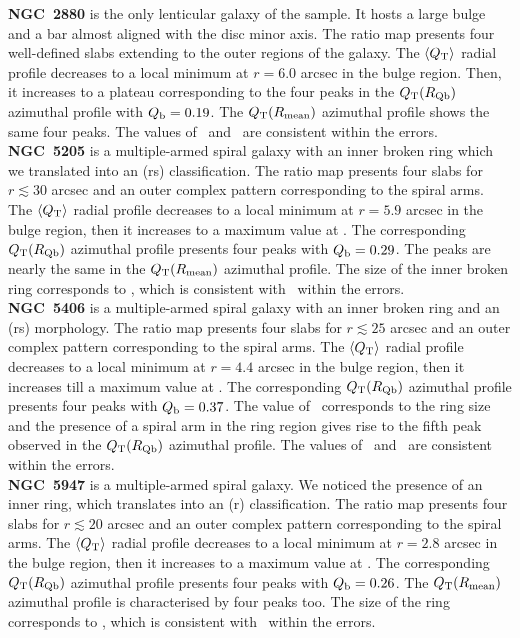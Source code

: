 \documentclass{aa}
\begin{document}
\noindent \textbf{NGC~2880} is the only lenticular galaxy of the sample. It hosts a large bulge and a bar almost aligned with the disc minor axis. The ratio map presents four well-defined slabs extending to the outer regions of the galaxy. The $\langle Q_{\rm T}\rangle$ radial profile decreases to a local minimum at $r=6.0$ arcsec in the bulge region. Then, it increases to a plateau corresponding to the four peaks in the $Q_{\rm T}(R_{\rm Qb})$ azimuthal profile with $Q_{\rm b}=0.19$. The $Q_{\rm T}(R_{\rm mean})$
azimuthal profile shows the same four peaks. The values of \rmean\ and \rqb\ are consistent within the errors.\\

\noindent \textbf{NGC~5205} is a multiple-armed spiral galaxy with an inner broken ring which we translated into an (rs) classification. The ratio map presents four slabs for $r\lesssim30$ arcsec and an outer complex pattern corresponding to the spiral arms. The $\langle Q_{\rm T}\rangle$ radial profile decreases to a local minimum at $r=5.9$ arcsec in the bulge region, then it increases to a maximum value at \rqb. The corresponding $Q_{\rm T}(R_{\rm Qb})$ azimuthal profile presents four peaks with $Q_{\rm b}=0.29$. The peaks are nearly the same in the $Q_{\rm T}(R_{\rm mean})$ azimuthal profile. The size of the inner broken ring corresponds to \rmean, which is consistent with \rqb\ within the errors.\\

\noindent \textbf{NGC~5406} is a multiple-armed spiral galaxy with an inner broken ring and an (rs) morphology. The ratio map presents four slabs for $r\lesssim25$ arcsec and an outer complex pattern corresponding to the spiral arms. The $\langle Q_{\rm T}\rangle$ radial profile decreases to a local minimum at $r=4.4$ arcsec in the bulge region, then it increases till a maximum value at \rqb. The corresponding $Q_{\rm T}(R_{\rm Qb})$ azimuthal profile presents four peaks with $Q_{\rm b}=0.37$. The value of \rmean\ corresponds to the ring size and the presence of a spiral arm in the ring region gives rise to the fifth peak observed in the $Q_{\rm T}(R_{\rm Qb})$ azimuthal profile. The values of \rmean\ and \rqb\ are consistent within the errors.\\

\noindent \textbf{NGC~5947} is a multiple-armed spiral galaxy. We noticed the presence of an inner ring, which translates into an (r) classification. The ratio map presents four slabs for $r\lesssim20$ arcsec and an outer complex pattern corresponding to the spiral arms. The $\langle Q_{\rm T}\rangle$ radial profile decreases to a local minimum at $r=2.8$ arcsec in the bulge region, then it increases to a maximum value at \rqb. The corresponding $Q_{\rm T}(R_{\rm Qb})$ azimuthal profile presents four peaks with $Q_{\rm b}=0.26$. The $Q_{\rm T}(R_{\rm mean})$ azimuthal profile is characterised by four peaks too. The size of the ring corresponds to \rmean, which is consistent with \rqb\ within the errors.\\
\end{document}
